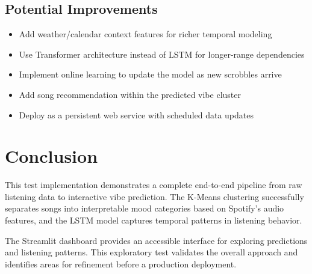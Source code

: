 \documentclass[12pt, a4paper]{article}
\begin{document}
\subsection{Potential Improvements}
\begin{itemize}
    \item Add weather/calendar context features for richer temporal modeling
    \item Use Transformer architecture instead of LSTM for longer-range dependencies
    \item Implement online learning to update the model as new scrobbles arrive
    \item Add song recommendation within the predicted vibe cluster
    \item Deploy as a persistent web service with scheduled data updates
\end{itemize}

\section{Conclusion}

This test implementation demonstrates a complete end-to-end pipeline from raw listening data to interactive vibe prediction. The K-Means clustering successfully separates songs into interpretable mood categories based on Spotify's audio features, and the LSTM model captures temporal patterns in listening behavior.

The Streamlit dashboard provides an accessible interface for exploring predictions and listening patterns. This exploratory test validates the overall approach and identifies areas for refinement before a production deployment.
\end{document}
